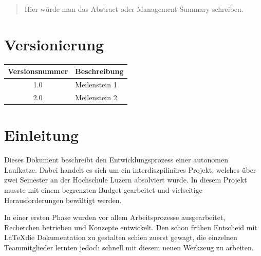\documentclass[a4paper]{report}
\begin{document}
\newpage

\begin{abstract}
	Hier würde man das Abstract oder Management Summary schreiben.
\end{abstract}

\chapter*{Versionierung}
\label{ch*:Vers}
\vspace{2em}

\noindent
\begin{tabular}{|c|p{}|}
	\hline
	\textbf{Versionsnummer} & \textbf{Beschreibung}\\
	\hline
	1.0 & Meilenstein 1 \\
	\hline
	2.0 & Meilenstein 2 \\
	\hline
\end{tabular}

\tableofcontents

\newpage


\chapter{Einleitung}
\label{ch:Intro}

Dieses Dokument beschreibt den Entwicklungsprozess einer autonomen Laufkatze. Dabei handelt es sich um ein interdiszpilinäres Projekt, welches über zwei Semester an der Hochschule Luzern absolviert wurde. In diesem Projekt musste mit einem begrenzten Budget gearbeitet und vielseitige Herausforderungen bewältigt werden.

In einer ersten Phase wurden vor allem Arbeitsprozesse ausgearbeitet, Recherchen betrieben und Konzepte entwickelt. Den schon frühen Entscheid mit \LaTeX  die Dokumentation zu gestalten schien zuerst gewagt, die einzelnen Teammitglieder lernten jedoch schnell mit diesem neuen Werkzeug zu arbeiten.
\end{document}
